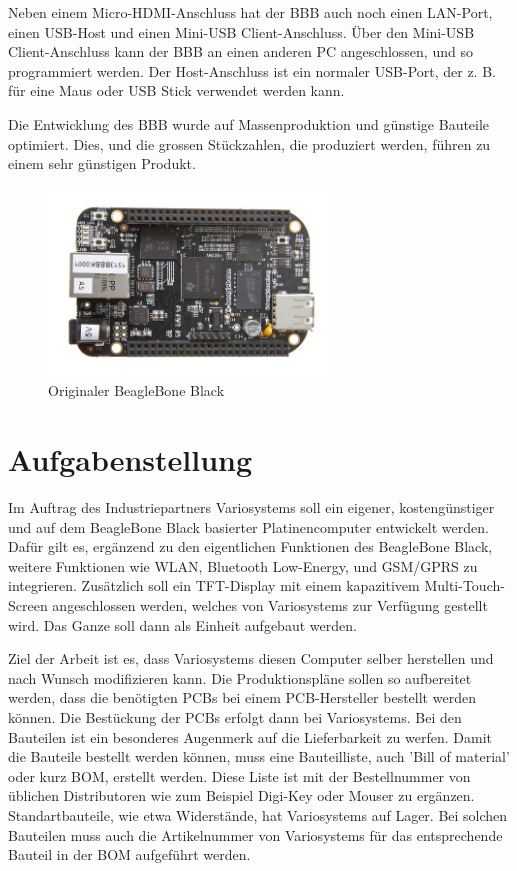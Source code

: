 Neben einem Micro-HDMI-Anschluss hat der BBB auch noch einen LAN-Port, einen USB-Host und einen Mini-USB Client-Anschluss. Über den Mini-USB Client-Anschluss kann der BBB an einen anderen PC angeschlossen, und so programmiert werden. Der Host-Anschluss ist ein normaler USB-Port, der z. B. für eine Maus oder USB Stick verwendet werden kann.

Die Entwicklung des BBB wurde auf Massenproduktion und günstige Bauteile optimiert. Dies, und die grossen Stückzahlen, die produziert werden, führen zu einem sehr günstigen Produkt.

\begin{figure}[!ht]
\centering
\includegraphics[angle=0,height=5cm]{images/BeagleBoneBlack.jpg}
\caption{Originaler BeagleBone Black}
\label{fig:BeagleBoneBlack}
\end{figure}


\section{Aufgabenstellung}
Im Auftrag des Industriepartners Variosystems soll ein eigener, kostengünstiger und auf dem BeagleBone Black basierter Platinencomputer entwickelt werden. Dafür gilt es, ergänzend zu den eigentlichen Funktionen des BeagleBone Black, weitere Funktionen wie WLAN, Bluetooth Low-Energy, und GSM/GPRS zu integrieren. Zusätzlich soll ein TFT-Display mit einem kapazitivem Multi-Touch-Screen angeschlossen werden, welches von Variosystems zur Verfügung gestellt wird. Das Ganze soll dann als Einheit aufgebaut werden.

Ziel der Arbeit ist es, dass Variosystems diesen Computer selber herstellen und nach Wunsch modifizieren kann. Die Produktionspläne sollen so aufbereitet werden, dass die benötigten PCBs bei einem PCB-Hersteller bestellt werden können. Die Bestückung der PCBs erfolgt dann bei Variosystems. Bei den Bauteilen ist ein besonderes Augenmerk auf die Lieferbarkeit zu werfen. Damit die Bauteile bestellt werden können, muss eine Bauteilliste, auch 'Bill of material' oder kurz BOM, erstellt werden. Diese Liste ist mit der Bestellnummer von üblichen Distributoren wie zum Beispiel Digi-Key oder Mouser zu ergänzen. Standartbauteile, wie etwa Widerstände, hat Variosystems auf Lager. Bei solchen Bauteilen muss auch die Artikelnummer von Variosystems für das entsprechende Bauteil in der BOM aufgeführt werden.

